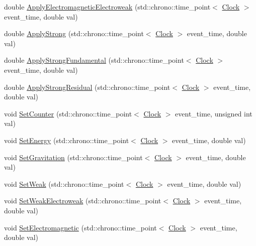 \begin{DoxyCompactItemize}
\item 
double \hyperlink{class_elementary_force_a3764a27b11760b6ead2c8a23ff25d77a}{Apply\+Electromagnetic\+Electroweak} (std\+::chrono\+::time\+\_\+point$<$ \hyperlink{universe_8h_a0ef8d951d1ca5ab3cfaf7ab4c7a6fd80}{Clock} $>$ event\+\_\+time, double val)
\item 
double \hyperlink{class_elementary_force_a8a16bff6b5df2b0ff918262bf6376ade}{Apply\+Strong} (std\+::chrono\+::time\+\_\+point$<$ \hyperlink{universe_8h_a0ef8d951d1ca5ab3cfaf7ab4c7a6fd80}{Clock} $>$ event\+\_\+time, double val)
\item 
double \hyperlink{class_elementary_force_a80f1977e777aa0c8cce2124b666e6446}{Apply\+Strong\+Fundamental} (std\+::chrono\+::time\+\_\+point$<$ \hyperlink{universe_8h_a0ef8d951d1ca5ab3cfaf7ab4c7a6fd80}{Clock} $>$ event\+\_\+time, double val)
\item 
double \hyperlink{class_elementary_force_a185dc4e0b840505df27dbbed9fdcdc7b}{Apply\+Strong\+Residual} (std\+::chrono\+::time\+\_\+point$<$ \hyperlink{universe_8h_a0ef8d951d1ca5ab3cfaf7ab4c7a6fd80}{Clock} $>$ event\+\_\+time, double val)
\item 
void \hyperlink{class_elementary_force_a3762cf66ed266b310446417215dec3fa}{Set\+Counter} (std\+::chrono\+::time\+\_\+point$<$ \hyperlink{universe_8h_a0ef8d951d1ca5ab3cfaf7ab4c7a6fd80}{Clock} $>$ event\+\_\+time, unsigned int val)
\item 
void \hyperlink{class_elementary_force_a466c84ee4a50a29ef1f0fc6509ae3161}{Set\+Energy} (std\+::chrono\+::time\+\_\+point$<$ \hyperlink{universe_8h_a0ef8d951d1ca5ab3cfaf7ab4c7a6fd80}{Clock} $>$ event\+\_\+time, double val)
\item 
void \hyperlink{class_elementary_force_aa36d5875964f7e2fc981f6fc5431be7f}{Set\+Gravitation} (std\+::chrono\+::time\+\_\+point$<$ \hyperlink{universe_8h_a0ef8d951d1ca5ab3cfaf7ab4c7a6fd80}{Clock} $>$ event\+\_\+time, double val)
\item 
void \hyperlink{class_elementary_force_a093cdf0810e95f1d973bd9dc88c6788b}{Set\+Weak} (std\+::chrono\+::time\+\_\+point$<$ \hyperlink{universe_8h_a0ef8d951d1ca5ab3cfaf7ab4c7a6fd80}{Clock} $>$ event\+\_\+time, double val)
\item 
void \hyperlink{class_elementary_force_a38d4f86f18a9f84a4198ee43bc90f6b4}{Set\+Weak\+Electroweak} (std\+::chrono\+::time\+\_\+point$<$ \hyperlink{universe_8h_a0ef8d951d1ca5ab3cfaf7ab4c7a6fd80}{Clock} $>$ event\+\_\+time, double val)
\item 
void \hyperlink{class_elementary_force_a67f6845bd715c29c17387d291b343a1b}{Set\+Electromagnetic} (std\+::chrono\+::time\+\_\+point$<$ \hyperlink{universe_8h_a0ef8d951d1ca5ab3cfaf7ab4c7a6fd80}{Clock} $>$ event\+\_\+time, double val)

\end{DoxyCompactItemize}
